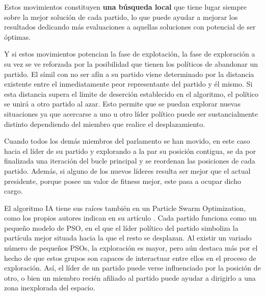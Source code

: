 Estos movimientos constituyen \textbf{una búsqueda local} que tiene lugar siempre sobre la mejor solución de cada partido, lo que puede ayudar a mejorar los resultados dedicando más evaluaciones a aquellas soluciones con potencial de ser óptimas.

Y si estos movimientos potencian la fase de explotación, la fase de exploración a su vez se ve reforzada por la posibilidad que tienen los políticos de abandonar un partido. El símil con no ser afín a su partido viene determinado por la distancia existente entre el inmediatamente peor representante del partido y él mismo. Si esta distancia supera el límite de deserción establecido en el algoritmo, el político se unirá a otro partido al azar. Esto permite que se puedan explorar nuevas situaciones ya que acercarse a uno u otro líder político puede ser sustancialmente distinto dependiendo del miembro que realice el desplazamiento.

Cuando todos los demás miembros del parlamento se han movido, en este caso hacia el líder de su partido y explorando a la par su posición contigua, se da por finalizada una iteración del bucle principal y se reordenan las posiciones de cada partido. Además, si alguno de los nuevos líderes resulta ser mejor que el actual presidente, porque posee un valor de fitness mejor, este pasa a ocupar dicho cargo.

El algoritmo IA tiene sus raíces también en un Particle Swarm Optimization, como los propios autores indican en su artículo \cite{ia-article}. Cada partido funciona como un pequeño modelo de PSO, en el que el líder político del partido simboliza la partícula mejor situada hacia la que el resto se desplazan. Al existir un variado número de pequeños PSOs, la exploración es mayor, pero aún destaca más por el hecho de que estos grupos son capaces de interactuar entre ellos en el proceso de exploración. Así, el líder de un partido puede verse influenciado por la posición de otro, o bien un miembro recién afiliado al partido puede ayudar a dirigirlo a una zona inexplorada del espacio.